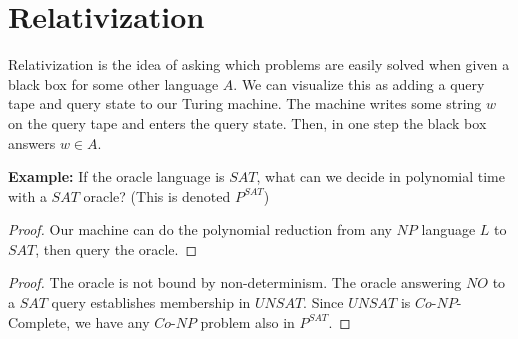 







\section*{Relativization}

Relativization is the idea of asking which problems are easily solved when given a black box for some other language $A$.  We can visualize this as adding a query tape and query state to our Turing machine.  The machine writes some string $w$ on the query tape and enters the query state.  Then, in one step the black box answers $w\in A$.



\textbf{Example:} If the oracle language is $SAT$, what can we decide in polynomial time with a $SAT$ oracle? (This is denoted $P^{SAT}$)


\begin{proof}
	
	Our machine can do the polynomial reduction from any $NP$ language $L$ to $SAT$, then query the oracle.
	
	\end{proof}
	
	
	
	\begin{proof}
		
		The oracle is not bound by non-determinism.  The  oracle answering $NO$ to a $SAT$ query establishes membership in $UNSAT$.  Since $UNSAT$ is $Co$-$NP$-Complete, we have any $Co$-$NP$ problem also in $P^{SAT}$.
		
		
	\end{proof}	
	

